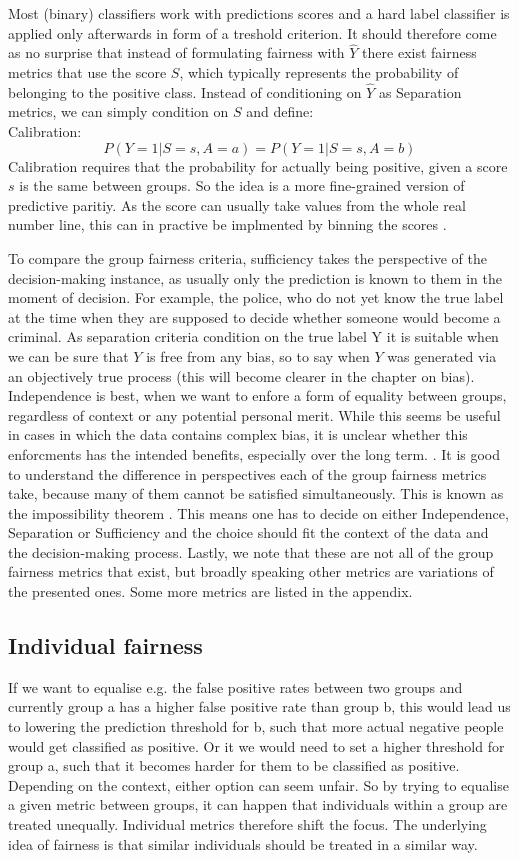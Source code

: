 Most (binary) classifiers work with predictions scores and a hard label classifier is applied only afterwards in form of a treshold criterion. It should therefore come as no surprise that instead of formulating fairness with $\hat{Y}$ there exist fairness metrics that use the score $S$, which typically represents the probability of belonging to the positive class. Instead of conditioning on $\hat{Y}$ as Separation metrics, we can simply condition on $S$ and define: \\
Calibration: $$P(Y = 1 | S = s, A = a) = P(Y = 1 | S = s, A = b)$$
Calibration requires that the probability for actually being positive, given a score $s$ is the same between groups. So the idea is a more fine-grained version of predictive paritiy. As the score can usually take values from the whole real number line, this can in practive be implmented by binning the scores \cite{verma2018}.

To compare the group fairness criteria, sufficiency takes the perspective of the decision-making instance, as usually only the prediction is known to them in the moment of decision. For example, the police, who do not yet know the true label at the time when they are supposed to decide whether someone would become a criminal.
As separation criteria condition on the true label Y it is suitable when we can be sure that $Y$ is free from any bias, so to say when $Y$ was generated via an objectively true process (this will become clearer in the chapter on bias).
Independence is best, when we want to enfore a form of equality between groups, regardless of context or any potential personal merit. While this seems be useful in cases in which the data contains complex bias, it is unclear whether this enforcments has the intended benefits, especially over the long term. {\color{red}{reference?}}.
It is good to understand the difference in perspectives each of the group fairness metrics take, because many of them cannot be satisfied simultaneously. This is known as the impossibility theorem \cite{hardt2016}. This means one has to decide on either Independence, Separation or Sufficiency and the choice should fit the context of the data and the decision-making process. Lastly, we note that these are not all of the group fairness metrics that exist, but broadly speaking other metrics are variations of the presented ones. Some more metrics are listed in the appendix.

\subsection{Individual fairness}
If we want to equalise e.g. the false positive rates between two groups and currently group a has a higher false positive rate than group b, this would lead us to lowering the prediction threshold for b, such that more actual negative people would get classified as positive. Or it we would need to set a higher threshold for group a, such that it becomes harder for them to be classified as positive. Depending on the context, either option can seem unfair. So by trying to equalise a given metric between groups, it can happen that individuals within a group are treated unequally. Individual metrics therefore shift the focus. The underlying idea of fairness is that similar individuals should be treated in a similar way.
